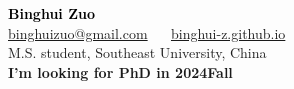 \documentclass[margin, centered]{res}
\begin{document}
\begin{center}
    \hspace{-\hoffset}
    \vspace{3mm}
    \huge {\textcolor{black}{\textbf{Binghui Zuo}}}\\
    
    \hspace{-\hoffset}
    \large \href{mailto:binghuizuo@gmail.com}{binghuizuo@gmail.com} ~\textbullet~ \href{https://binghui-z.github.io/}{binghui-z.github.io} \\
    \hspace{-\hoffset}
    M.S. student, Southeast University, China \\
    \hspace{-\hoffset}
    \textcolor[rgb]{1,0,0}{\textbf{I'm looking for PhD in 2024Fall}}
\end{center}
\end{document}
